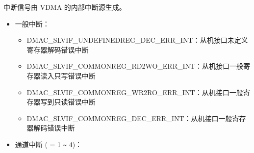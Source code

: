 \documentclass[main\_\_CN.tex]{subfiles}
\begin{document}
中断信号由 VDMA 的内部中断源生成。
\begin{itemize}
    \item 一般中断：
    \begin{itemize}
        \item \label{int:DMACSLVIFUNDEFINEDREGDECERRINT}DMAC\_SLVIF\_UNDEFINEDREG\_DEC\_ERR\_INT：从机接口未定义寄存器解码错误中断
        \item \label{int:DMACSLVIFCOMMONREGRD2WOERRINT}DMAC\_SLVIF\_COMMONREG\_RD2WO\_ERR\_INT：从机接口一般寄存器读入只写错误中断
        \item \label{int:DMACSLVIFCOMMONREGWR2ROERRINT}DMAC\_SLVIF\_COMMONREG\_WR2RO\_ERR\_INT：从机接口一般寄存器写到只读错误中断
        \item \label{int:DMACSLVIFCOMMONREGDECERRINT}DMAC\_SLVIF\_COMMONREG\_DEC\_ERR\_INT：从机接口一般寄存器解码错误中断
    \end{itemize}

    \item 通道中断 ( = 1 \verb+~+ 4)：


\end{itemize}
\end{document}
